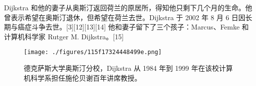 Dijkstra 和他的妻子从奥斯汀返回荷兰的原居所，得知他只剩下几个月的生命。他曾表示希望在奥斯汀退休，但希望在荷兰去世。Dijkstra 于 2002 年 8 月 6 日因长期与癌症斗争去世。[3][12][13][14] 他和妻子留下了三个孩子：Marcus、Femke 和计算机科学家 Rutger M. Dijkstra。[15]
\begin{figure}[ht]
\centering
\texttt{[image: ./figures/115f17324448499e.png]}
\caption{德克萨斯大学奥斯汀分校，Dijkstra 从 1984 年到 1999 年在该校计算机科学系担任施伦贝谢百年讲席教授。} \label{fig_ACHR_3}
\end{figure}